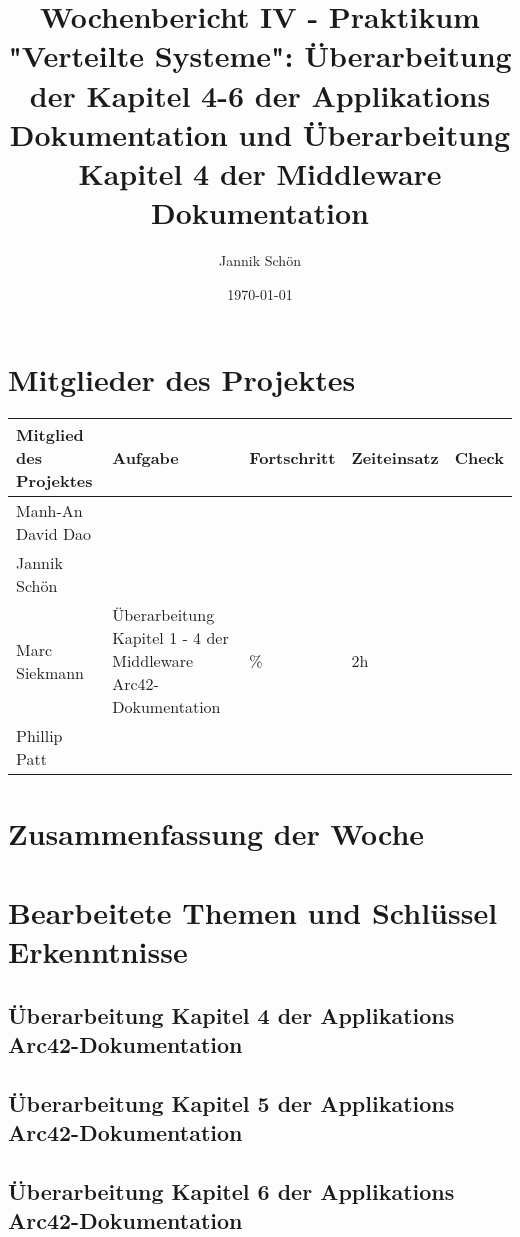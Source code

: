 \documentclass{article}
\title{Wochenbericht IV - Praktikum "Verteilte Systeme": Überarbeitung der Kapitel 4-6 der Applikations Dokumentation und Überarbeitung Kapitel 4 der Middleware Dokumentation}
\author{Jannik Schön}
\date{\today}
\begin{document}
\maketitle
\section{Mitglieder des Projektes }

\begin{tabular}{>{\raggedright\arraybackslash}p{3cm} >{\raggedright\arraybackslash}p{4cm} >{\centering\arraybackslash}p{2cm} >{\centering\arraybackslash}p{2cm} >{\raggedright\arraybackslash}p{3cm}}
\toprule
\textbf{Mitglied des Projektes} & \textbf{Aufgabe} & \textbf{Fortschritt} & \textbf{Zeiteinsatz} & \textbf{Check} \\
\midrule
Manh-An David Dao &  &  &  &  \\
\hline
Jannik Schön &  &  &  &  \\
\hline
Marc Siekmann & Überarbeitung Kapitel 1 - 4 der Middleware Arc42-Dokumentation & 60\% & 2h &  \\
\hline
Phillip Patt & & & & \\

\bottomrule
\end{tabular}

\section{Zusammenfassung der Woche}

\section{Bearbeitete Themen und Schlüssel Erkenntnisse}

\subsection{Überarbeitung Kapitel 4 der Applikations Arc42-Dokumentation}



\subsection{Überarbeitung Kapitel 5 der Applikations Arc42-Dokumentation}




\subsection{Überarbeitung Kapitel 6 der Applikations Arc42-Dokumentation}
\end{document}
